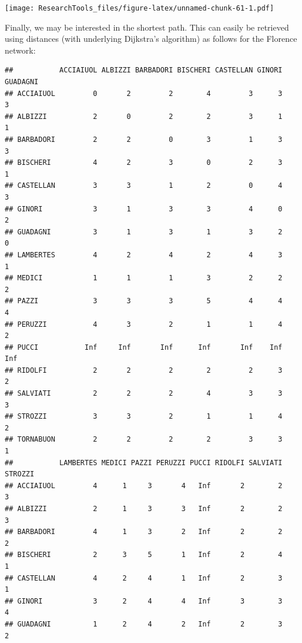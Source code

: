\documentclass[]{article}
\newenvironment{Shaded}{\begin{snugshade}}{\end{snugshade}}
\newcommand{\KeywordTok}[1]{\textcolor[rgb]{0.13,0.29,0.53}{\textbf{{#1}}}}
\newcommand{\NormalTok}[1]{{#1}}
\begin{document}
\texttt{[image: ResearchTools\_files/figure-latex/unnamed-chunk-61-1.pdf]}

Finally, we may be interested in the shortest path. This can easily be
retrieved using distances (with underlying Dijkstra's algorithm) as
follows for the Florence network:

\begin{Shaded}
\end{Shaded}

\begin{verbatim}
##           ACCIAIUOL ALBIZZI BARBADORI BISCHERI CASTELLAN GINORI GUADAGNI
## ACCIAIUOL         0       2         2        4         3      3        3
## ALBIZZI           2       0         2        2         3      1        1
## BARBADORI         2       2         0        3         1      3        3
## BISCHERI          4       2         3        0         2      3        1
## CASTELLAN         3       3         1        2         0      4        3
## GINORI            3       1         3        3         4      0        2
## GUADAGNI          3       1         3        1         3      2        0
## LAMBERTES         4       2         4        2         4      3        1
## MEDICI            1       1         1        3         2      2        2
## PAZZI             3       3         3        5         4      4        4
## PERUZZI           4       3         2        1         1      4        2
## PUCCI           Inf     Inf       Inf      Inf       Inf    Inf      Inf
## RIDOLFI           2       2         2        2         2      3        2
## SALVIATI          2       2         2        4         3      3        3
## STROZZI           3       3         2        1         1      4        2
## TORNABUON         2       2         2        2         3      3        1
##           LAMBERTES MEDICI PAZZI PERUZZI PUCCI RIDOLFI SALVIATI STROZZI
## ACCIAIUOL         4      1     3       4   Inf       2        2       3
## ALBIZZI           2      1     3       3   Inf       2        2       3
## BARBADORI         4      1     3       2   Inf       2        2       2
## BISCHERI          2      3     5       1   Inf       2        4       1
## CASTELLAN         4      2     4       1   Inf       2        3       1
## GINORI            3      2     4       4   Inf       3        3       4
## GUADAGNI          1      2     4       2   Inf       2        3       2

\end{verbatim}
\end{document}
